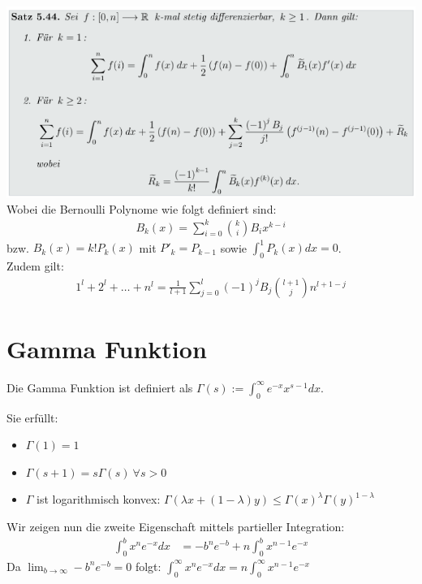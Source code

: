 \documentclass[25pt]{sciposter}
\begin{document}
\begin{multicols}{3}
\includegraphics[width=1\linewidth]{img/berThm.png}\\
Wobei die Bernoulli Polynome wie folgt definiert sind:
\begin{align*}
	B_k (x) = \sum_{i=0}^{k} {k \choose i} B_i x^{k-i} 
\end{align*}
bzw. $B_k (x) =k!P_k (x)$ mit $P'_k = P_{k-1}$ sowie $\int_{0}^{1} P_k (x) dx = 0$.\\
Zudem gilt:
\begin{align*}
	1^l + 2^l + \ldots + n^l = \frac{1}{l+1} \sum_{j=0}^{l} (-1)^j B_j { l+1 \choose j } n^{l+1-j}
\end{align*}






\section*{Gamma Funktion}

Die Gamma Funktion ist definiert als $\Gamma (s) := \int_{0} ^{\infty} e^{-x} x^{s-1} dx$.

Sie erfüllt:
\begin{itemize}
	\item $\Gamma(1) = 1$
	\item $\Gamma(s+1) = s\Gamma(s) \ \forall s > 0$
	\item $\Gamma$ ist logarithmisch konvex: $\Gamma(\lambda x + (1-\lambda)y) \leq \Gamma(x)^\lambda \Gamma(y)^{1-\lambda}$
\end{itemize}
Wir zeigen nun die zweite Eigenschaft mittels partieller Integration:
\begin{align*}
	\int_{0}^{b} x^n e^{-x} dx &= -b^n e^{-b} + n \int_{0}^{b} x^{n-1}e^{-x}
\end{align*}
Da $\lim_{b \to \infty}  -b^n e^{-b} = 0$ folgt: $\int_{0}^{\infty} x^n e^{-x} dx =n \int_{0}^{\infty} x^{n-1}e^{-x}$



\end{multicols}
\end{document}
